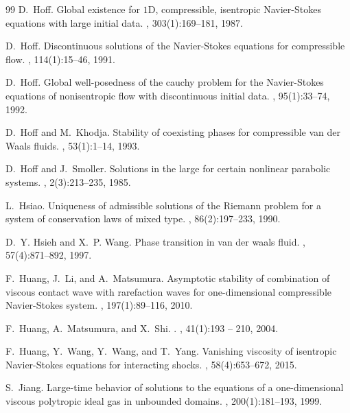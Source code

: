 \documentclass[a4paper,oneside,11pt]{article}
\numberwithin{equation}{section}
\begin{document}
\begin{thebibliography}{99}
D.~Hoff.
\newblock Global existence for {$1$}D, compressible, isentropic
  {N}avier-{S}tokes equations with large initial data.
, 303(1):169--181, 1987.

D.~Hoff.
\newblock Discontinuous solutions of the {N}avier-{S}tokes equations for
  compressible flow.
, 114(1):15--46, 1991.

D.~Hoff.
\newblock Global well-posedness of the cauchy problem for the Navier-Stokes
  equations of nonisentropic flow with discontinuous initial data.
, 95(1):33--74, 1992.

D.~Hoff and M.~Khodja.
\newblock Stability of coexisting phases for compressible van der {W}aals
  fluids.
, 53(1):1--14, 1993.

D.~Hoff and J.~Smoller.
\newblock Solutions in the large for certain nonlinear parabolic systems.
,
  2(3):213--235, 1985.

L.~Hsiao.
\newblock Uniqueness of admissible solutions of the {R}iemann problem for a
  system of conservation laws of mixed type.
, 86(2):197--233, 1990.

D.~Y. Hsieh and X.~P. Wang.
\newblock Phase transition in van der waals fluid.
, 57(4):871--892, 1997.

F.~Huang, J.~Li, and A.~Matsumura.
\newblock Asymptotic stability of combination of viscous contact wave with
  rarefaction waves for one-dimensional compressible {Navier-Stokes} system.
, 197(1):89--116, 2010.

F.~Huang, A.~Matsumura, and X.~Shi.
.
, 41(1):193 -- 210, 2004.

F.~Huang, Y.~Wang, Y.~Wang, and T.~Yang.
\newblock Vanishing viscosity of isentropic {Navier-Stokes} equations for
  interacting shocks.
, 58(4):653--672, 2015.

S.~Jiang.
\newblock Large-time behavior of solutions to the equations of a
  one-dimensional viscous polytropic ideal gas in unbounded domains.
, 200(1):181--193, 1999.


\end{thebibliography}
\end{document}
